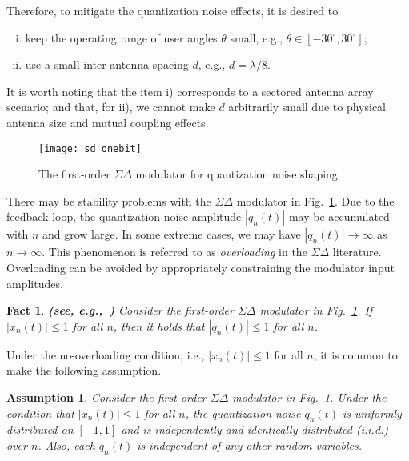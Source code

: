 \documentclass[10pt,twocolumn,twoside]{IEEEtran}
\newtheorem{Fact}{Fact}
\newtheorem{Asm}{Assumption}
\begin{document}
Therefore, to mitigate the quantization noise effects, it is desired to
\begin{enumerate}[i)]
\item
keep the operating range of user angles $\theta$ small, e.g., $\theta \in [-30^\circ, 30^\circ]$;
\item
use a small inter-antenna spacing $d$, e.g., $d = \lambda/8$.
\end{enumerate}
It is worth noting that the item i) corresponds to a sectored antenna array scenario;
and that, for ii), we cannot make $d$ arbitrarily small due to physical antenna size and mutual coupling effects.

\begin{figure}%
	\centering
	\texttt{[image: sd\_onebit]}
	\caption{The first-order ${\Sigma \Delta}$ modulator for quantization noise shaping.}
	\label{fig:sd_onebit}
\end{figure}

There may be stability problems with the $\Sigma \Delta$ modulator in Fig.~\ref{fig:sd_onebit}.
Due to the feedback loop, the quantization noise amplitude $|q_n(t)|$ may be accumulated with $n$ and grow large.
In some extreme cases, we may have $|q_{n}(t)| \to \infty$ as $n \to \infty$.
This phenomenon is referred to as {\it overloading} in the $\Sigma \Delta$ literature.
Overloading can be avoided by appropriately constraining the modulator input amplitudes.

\begin{Fact} \label{fact:no_overloading_onebit}
	{\bf (see, e.g.,~\cite{gray1990quantization,shao2019one})}
	Consider the first-order $\Sigma \Delta$ modulator in Fig.~\ref{fig:sd_onebit}.
	If $|x_n(t)| \le 1$ for all $n$, then it holds that $|q_n(t)| \le 1$ for all $n$.
\end{Fact}

\noindent
Under the no-overloading condition, i.e., $|x_n(t)| \le 1$ for all $n$,
it is common to make the following assumption.
\begin{Asm}\label{asm:q_onebit}
	Consider the first-order $\Sigma \Delta$ modulator in Fig.~\ref{fig:sd_onebit}.
	Under the condition that $|x_n(t)| \le 1$ for all $n$, the quantization noise $q_{n}(t)$ is uniformly distributed on $[-1,1]$ and is independently and identically distributed (i.i.d.) over $n$.
	Also, each $q_{n}(t)$ is independent of any other random variables.
\end{Asm}
\end{document}
